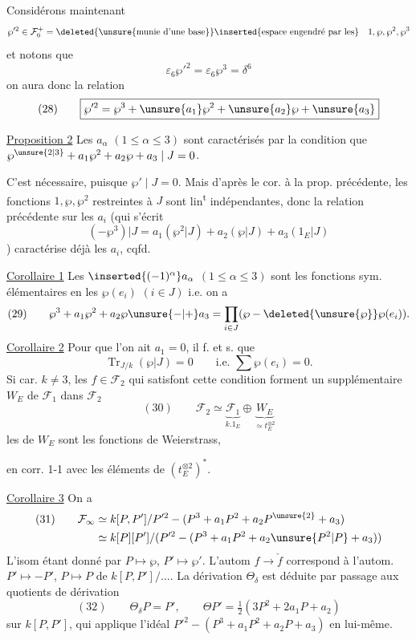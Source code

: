  Considérons maintenant
\[
\wp'^2\in\mathcal F_6^+=\deleted{\unsure{\text{munie d'une base}}}
\inserted{\text{espace engendré par les}} \quad1,\wp,\wp^2,\wp^3
\]
et notons que
\[
\varepsilon_6\wp'^2=\varepsilon_6\wp^3=\delta^6
\]
on aura donc la relation
\[
(28)\qquad\boxed{\wp'^2=\wp^3+\unsure{a_1}\wp^2+\unsure{a_2}\wp+\unsure{a_3}}
\]

\uline{Proposition 2} Les $a_\alpha$ $(1\leq\alpha\leq3)$ sont caractérisés par
la condition que $\wp^{\unsure{2|3}}+a_1\wp^2+a_2\wp+a_3\mid J=0$.

C'est nécessaire, puisque $\wp'\mid J=0$. Mais
d'après le cor. à la prop. précédente, les
fonctions $1,\wp,\wp^2$ restreintes à $J$ sont lin\textsuperscript{t}
indépendantes, donc la relation précédente
sur les $a_i$ (qui s'écrit
\[
(-\wp^3)|J=a_1(\wp^2|J)+a_2(\wp|J)+a_3(1_E|J)
\]
)
caractérise déjà les $a_i$, cqfd.

\uline{Corollaire 1} Les $\inserted{(-1)^\alpha}a_\alpha$ $(1\leq\alpha\leq3)$ sont les fonctions
sym. élémentaires en les $\wp(e_i)$ $(i\in J)$
i.e. on a
\[
(29)\qquad\wp^3+a_1\wp^2+a_2\wp\unsure{-|+}a_3
=\prod_{i\in J}(\wp-\deleted{\unsure{\wp}}\wp(e_i)).
\]
\uline{Corollaire 2} Pour que l'on ait $a_1=0$, il f. et s.
que
\[
\operatorname{Tr}_{J/k}(\wp|J)=0\qquad\text{i.e. }\sum\wp(e_i)=0.
\]
Si car. $k\ne3$, les $f\in\mathcal F_2$ qui satisfont cette
condition forment un supplémentaire
$W_E$ de $\mathcal F_1$ dans $\mathcal F_2$
\[
(30)\qquad\mathcal F_2\simeq\underbrace{\mathcal F_1}_{k.1_E}\oplus\underbrace{W_E}_{\simeq t_E^{\otimes2}}
\]
les  de $W_E$ sont  les fonctions de Weierstrass,


en corr. 1-1 avec les éléments de $(t_E^{\otimes2})^*$.

\uline{Corollaire 3} On a
\[
\begin{aligned}
(31)\qquad \mathcal F_\infty&\simeq k[P,P']/P'^2-(P^3+a_1P^2+a_2P^{\unsure{2}}+a_3)\\
&\simeq k[P][P']/(P'^2-(P^3+a_1P^2+a_2\unsure{P^2|P}+a_3))
\end{aligned}
\]
L'isom étant donné par $P\longmapsto\wp$, $P'\longmapsto\wp'$.
L'autom $f\longrightarrow\check f$ correspond à l'autom.
$P'\longmapsto-P'$, $P\longmapsto P$ de $k[P,P']/\ldots$.
La dérivation $\Theta_\delta$ est déduite par passage aux quotients de
 dérivation
\[
(32)\qquad \Theta_\delta P=P',\qquad \Theta P'=\tfrac12(3P^2+2a_1P+a_2)
\]
sur $k[P,P']$, qui applique l'idéal $P'^2-(P^3+a_1P^2+a_2P+a_3)$ en lui-même.

